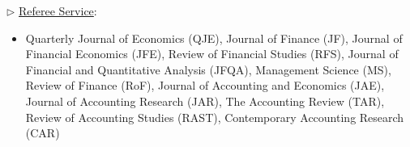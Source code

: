 \documentclass[11pt]{article}
\begin{document}
\vspace*{.17in}
$\triangleright$ \underline{Referee Service}:
\begin{itemize}
\vspace*{-.07in}
	\item  Quarterly Journal of Economics (QJE), Journal of Finance (JF), Journal of Financial Economics (JFE), Review of Financial Studies (RFS), Journal of Financial and Quantitative Analysis (JFQA), Management Science (MS), Review of Finance (RoF), Journal of Accounting and Economics (JAE), Journal of Accounting Research (JAR), The Accounting Review (TAR), Review of Accounting Studies (RAST), Contemporary Accounting Research (CAR)
\end{itemize}
\end{document}
